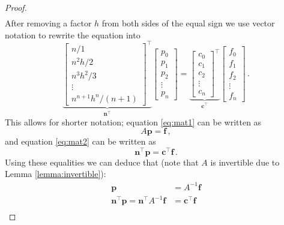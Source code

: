 \begin{proof}
\begin{align}
\end{align}
After removing a factor $h$ from both sides of the equal sign we use vector notation to rewrite the equation into
\begin{equation}
    \underbrace{\begin{bmatrix}
        n/1\\
        n^2h/2\\
        n^3h^2/3\\
        \vdots \\
        n^{n+1}h^n/(n+1)
    \end{bmatrix}^\top}_{\mathbf n^\top}
    \begin{bmatrix}
        p_0\\
        p_1\\
        p_2\\
        \vdots \\
        p_n
    \end{bmatrix}
    =
    \underbrace{\begin{bmatrix}
        c_0 \\
        c_1 \\
        c_2 \\
        \vdots \\
        c_n
    \end{bmatrix}^\top}_{\mathbf c^\top}
    \begin{bmatrix}
        f_0 \\
        f_1 \\
        f_2 \\
        \vdots \\
        f_n
    \end{bmatrix} \,. \label{eq:mat2}
\end{equation}
This allows for shorter notation; equation \ref{eq:mat1} can be written as
\begin{equation}
    A \mathbf p = \mathbf f \,, \nonumber
\end{equation}
and equation \ref{eq:mat2} can be written as
\begin{equation}
    \mathbf n ^\top \mathbf p = \mathbf c^\top \mathbf f \,. \nonumber
\end{equation}
Using these equalities we can deduce that (note that $A$ is invertible due to Lemma \ref{lemma:invertible}):
\begin{align}
    \mathbf p &= A^{-1} \mathbf f \nonumber \\
    \mathbf n^\top \mathbf p = \mathbf n^\top A^{-1} \mathbf f &= \mathbf c^\top \mathbf f \nonumber \\

\end{align}
\end{proof}
